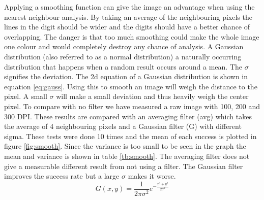 Applying a smoothing function can give the image an advantage when using the nearest neighbour analysis.
By taking an average of the neighbouring pixels the lines in the digit should be wider and the digits should have a better chance of overlapping.
The danger is that too much smoothing could make the whole image one colour and would completely destroy any chance of analysis.
A Gaussian distribution (also referred to as a normal distribution) a naturally occurring distribution that happens when a random result occurs around a mean. 
The $\sigma$ signifies the deviation. 
The 2d equation of a Gaussian distribution is shown in equation \ref{eq:gauss}. 
Using this to smooth an image will weigh the distance to the pixel.
A small $\sigma$ will make a small deviation and thus heavily weigh the center pixel.
To compare with no filter we have measured a raw image with 100, 200 and 300 DPI.
These results are compared with an averaging filter (avg) which takes the average of 4 neighbouring pixels and a Gaussian filter (G) with different sigma.
These tests were done 10 times and the mean of each success is plotted in figure \ref{fig:smooth}. 
Since the variance is too small to be seen in the graph the mean and variance is shown in table \ref{tb:smooth}.
The averaging filter does not give a measurable different result from not using a filter.
The Gaussian filter improves the success rate but a large $\sigma$ makes it worse.
\begin{equation}
G(x,y) = \frac{1}{2\pi \sigma^2} e^{- \frac{x^2+y^2}{2\sigma^2}} \label{eq:gauss}
\end{equation}